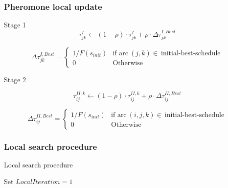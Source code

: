 \begin{frame} \frametitle{Pheromone local update} 

\begin{block} {Stage 1}
\begin{equation} \label{eq:acsTauStage1UpdateLocal}
\tau_{jk}^{I} \leftarrow (1 - \rho)\cdot\tau_{jk}^{I} +\rho\cdot\Delta\tau_{jk}^{I,Best}
\end{equation}

	
\begin{equation}
\Delta\tau_{jk}^{I,Best} = 
\begin{cases} 
1/F(s_{init}) & \text{if arc}~(j,k)\in~\text{initial-best-schedule} \\
0			& \text{Otherwise}
\end{cases}
\end{equation}

	
\end{block}

\begin{block}{Stage 2}
	
\begin{equation} \label{eq:acsTauStage2UpdateLocal}
\tau_{ij}^{II,k} \leftarrow (1 - \rho)\cdot\tau_{ij}^{II,k} +\rho\cdot\Delta\tau_{ij}^{II,Best}
\end{equation}

\begin{equation}
\Delta\tau_{ij}^{II,Best} = 
\begin{cases} 
1/F(s_{init}) & \text{if arc}~(i,j,k)\in~\text{initial-best-schedule} \\
0			& \text{Otherwise}
\end{cases}
\end{equation}


\end{block}


\end{frame}



\begin{frame}[fragile] \frametitle{Local search procedure} 


\begin{algorithm}[H]
	\footnotesize
	\caption{Local search procedure}
	\label{alg:acoLocalSearch}
	Set $LocalIteration = 1$\;
\end{algorithm}

\end{frame}


